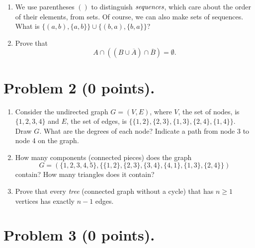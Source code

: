 \documentclass{../homework}
\begin{document}
\begin{enumerate}
    \item We use parentheses $()$ to distinguish $\emph{sequences}$, which care about the order of their elements, from sets. Of course, we can also make sets of sequences. What is $\{(a, b), \{a, b\}\} \cup \{(b, a), \{b, a\}\}$?
    
    \item Prove that
    \[
        A \cap ((B \cup \overline{A}) \cap \overline{B} ) = \emptyset.
    \]

\end{enumerate}



\clearpage
\section{Problem 2 (0 points).}

\begin{enumerate}
    \item Consider the undirected graph $G = (V, E)$, where $V$, the set of nodes, is $\{1, 2, 3, 4\}$ and $E$, the set of edges, is $\{\{1, 2\}, \{2, 3\}, \{1, 3\}, \{2, 4\}, \{1, 4\}\}$. Draw $G$. What are the degrees of each node? Indicate a path from node 3 to node 4 on the graph.
    
    \item How many components (connected pieces) does the graph 
    \[
        G = (\{1, 2, 3, 4, 5\}, \{ \{1,2\}, \{2,3\}, \{3,4\}, \{4,1\}, \{1,3\}, \{2,4\}\})
    \]
    contain? How many triangles does it contain?
    
    \item Prove that every \emph{tree} (connected graph without a cycle) that has $n \geq 1$ vertices has exactly $n-1$ edges.

\end{enumerate}





\clearpage
\section{Problem 3 (0 points).}
\end{document}
